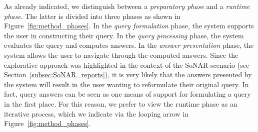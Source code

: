 As already indicated, we distinguish between a \emph{preparatory phase}
and a \emph{runtime phase}.
The latter is divided into three phases as shown in Figure~\ref{fig:method_phases}.
In the \emph{query formulation} phase, the system supports the user 
in constructing their query.
In the \emph{query processing} phase, the system evaluates the query
and computes answers.
In the \emph{answer presentation} phase, the system allows the user to
navigate through the computed answers.
Since the explorative approach was highlighted
in the context of the \gls{SoNAR} scenario (see Section~\ref{subsec:SoNAR_reports}),
it is very likely that the answers presented by the system will 
result in the user wanting to reformulate their original query.
In fact, query answers can be seen as one means of support
for formulating a query in the first place.
For this reason, we prefer to view the runtime phase as an iterative process,
which we indicate via the looping arrow in Figure~\ref{fig:method_phases}.

